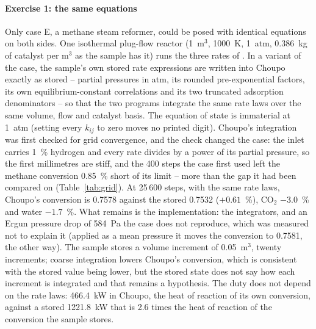 \documentclass[preprint,12pt]{elsarticle}
\begin{document}
\paragraph{Exercise 1: the same equations}  Only case E, a methane steam
reformer, could be posed with identical equations on both sides.  One
isothermal plug-flow reactor (1~m$^3$, 1000~K, 1~atm, 0.386~kg of catalyst
per m$^3$ as the sample has it) runs the three rates of
\citet{xu1989}.  In a variant of the case, the sample's own stored rate
expressions are written into Choupo exactly as stored -- partial pressures
in atm, its rounded pre-exponential factors, its own equilibrium-constant
correlations and its two truncated adsorption denominators -- so that the
two programs integrate the same rate laws over the same volume, flow and
catalyst basis.  The equation of state is immaterial at 1~atm (setting
every $k_{ij}$ to zero moves no printed digit).  Choupo's integration was
first checked for grid convergence, and the check changed the case: the
inlet carries 1~\% hydrogen and every rate divides by a power of its
partial pressure, so the first millimetres are stiff, and the 400 steps the
case first used left the methane conversion 0.85~\% short of its limit --
more than the gap it had been compared on (Table~\ref{tab:grid}).  At
25\,600 steps, with the same rate laws, Choupo's conversion is 0.7578
against the stored 0.7532 ($+0.61$~\%), CO$_2$ $-3.0$~\% and water
$-1.7$~\%.  What remains is the implementation: the integrators, and an
Ergun pressure drop of 584~Pa the case does not reproduce, which was
measured not to explain it (applied as a mean pressure it moves the
conversion to 0.7581, the other way).  The sample stores a volume
increment of 0.05~m$^3$, twenty increments; coarse integration lowers
Choupo's conversion, which is consistent with the stored value being lower,
but the stored state does not say how each increment is integrated and
that remains a hypothesis.  The duty does not depend on the rate laws:
466.4~kW in Choupo, the heat of reaction of its own conversion, against a
stored 1221.8~kW that is 2.6 times the heat of reaction of the conversion
the sample stores.
\end{document}
